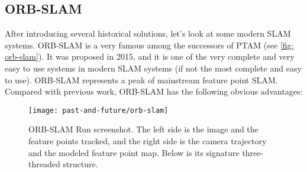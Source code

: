 \subsection{ORB-SLAM}

After introducing several historical solutions, let's look at some modern SLAM systems. ORB-SLAM is a very famous \textsuperscript{\cite{Mur-Artal2015}} among the successors of PTAM (see \autoref{fig: orb-slam}). It was proposed in 2015, and it is one of the very complete and very easy to use systems in modern SLAM systems (if not the most complete and easy to use). ORB-SLAM represents a peak of mainstream feature point SLAM. Compared with previous work, ORB-SLAM has the following obvious advantages:

\begin{figure}[! ht]
\centering
\texttt{[image: past-and-future/orb-slam]}
\caption{ORB-SLAM Run screenshot. The left side is the image and the feature points tracked, and the right side is the camera trajectory and the modeled feature point map. Below is its signature three-threaded structure. }
\label{fig: orb-slam}
\end{figure}

